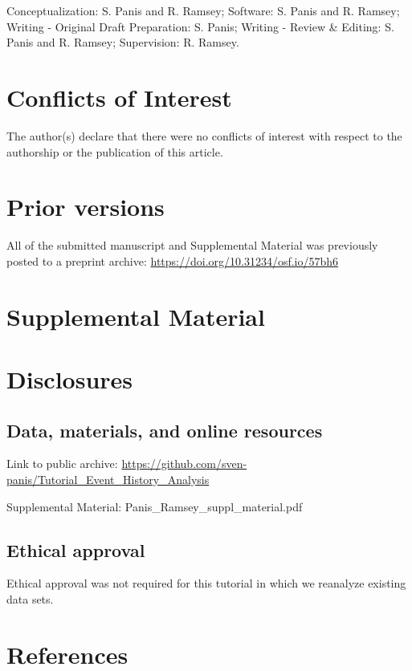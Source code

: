 \documentclass[
  man, donotrepeattitle,floatsintext]{apa6}
\begin{document}
Conceptualization: S. Panis and R. Ramsey; Software: S. Panis and R. Ramsey; Writing - Original Draft Preparation: S. Panis; Writing - Review \& Editing: S. Panis and R. Ramsey; Supervision: R. Ramsey.

\section{Conflicts of Interest}\label{conflicts-of-interest}

The author(s) declare that there were no conflicts of interest with respect to the authorship or the publication of this article.

\section{Prior versions}\label{prior-versions}

All of the submitted manuscript and Supplemental Material was previously posted to a preprint archive: \url{https://doi.org/10.31234/osf.io/57bh6}

\section{Supplemental Material}\label{supplemental-material}

\section{Disclosures}\label{disclosures}

\subsection{Data, materials, and online resources}\label{data-materials-and-online-resources}

Link to public archive: \url{https://github.com/sven-panis/Tutorial_Event_History_Analysis}

Supplemental Material: Panis\_Ramsey\_suppl\_material.pdf

\subsection{Ethical approval}\label{ethical-approval}

Ethical approval was not required for this tutorial in which we reanalyze existing data sets.

\newpage

\section{References}\label{references}
\end{document}
